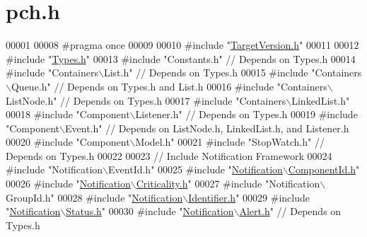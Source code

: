 \hypertarget{pch_8h_source}{}\section{pch.\+h}
\label{pch_8h_source}

\begin{DoxyCode}
00001 
00008 \textcolor{preprocessor}{#pragma once}
00009 
00010 \textcolor{preprocessor}{#include "\mbox{\hyperlink{_target_version_8h}{TargetVersion.h}}"}
00011 
00012 \textcolor{preprocessor}{#include "\mbox{\hyperlink{_types_8h}{Types.h}}"}
00013 \textcolor{preprocessor}{#include "Constants.h"}              \textcolor{comment}{// Depends on Types.h}
00014 \textcolor{preprocessor}{#include "Containers\(\backslash\)List.h"}        \textcolor{comment}{// Depends on Types.h}
00015 \textcolor{preprocessor}{#include "Containers\(\backslash\)Queue.h"}       \textcolor{comment}{// Depends on Types.h and List.h}
00016 \textcolor{preprocessor}{#include "Containers\(\backslash\)ListNode.h"}    \textcolor{comment}{// Depends on Types.h}
00017 \textcolor{preprocessor}{#include "Containers\(\backslash\)LinkedList.h"}
00018 \textcolor{preprocessor}{#include "Component\(\backslash\)Listener.h"}     \textcolor{comment}{// Depends on Types.h}
00019 \textcolor{preprocessor}{#include "Component\(\backslash\)Event.h"}        \textcolor{comment}{// Depends on ListNode.h, LinkedList.h, and Listener.h}
00020 \textcolor{preprocessor}{#include "Component\(\backslash\)Model.h"}
00021 \textcolor{preprocessor}{#include "StopWatch.h"}              \textcolor{comment}{// Depends on Types.h}
00022 
00023 \textcolor{comment}{// Include Notification Framework}
00024 \textcolor{preprocessor}{#include "Notification\(\backslash\)EventId.h"}
00025 \textcolor{preprocessor}{#include "\mbox{\hyperlink{_component_id_8h}{Notification\(\backslash\)ComponentId.h}}"}
00026 \textcolor{preprocessor}{#include "\mbox{\hyperlink{_criticality_8h}{Notification\(\backslash\)Criticality.h}}"}
00027 \textcolor{preprocessor}{#include "Notification\(\backslash\)GroupId.h"}
00028 \textcolor{preprocessor}{#include "\mbox{\hyperlink{_identifier_8h}{Notification\(\backslash\)Identifier.h}}"}
00029 \textcolor{preprocessor}{#include "\mbox{\hyperlink{_status_8h}{Notification\(\backslash\)Status.h}}"}
00030 \textcolor{preprocessor}{#include "\mbox{\hyperlink{_alert_8h}{Notification\(\backslash\)Alert.h}}"}     \textcolor{comment}{// Depends on Types.h}
\end{DoxyCode}
